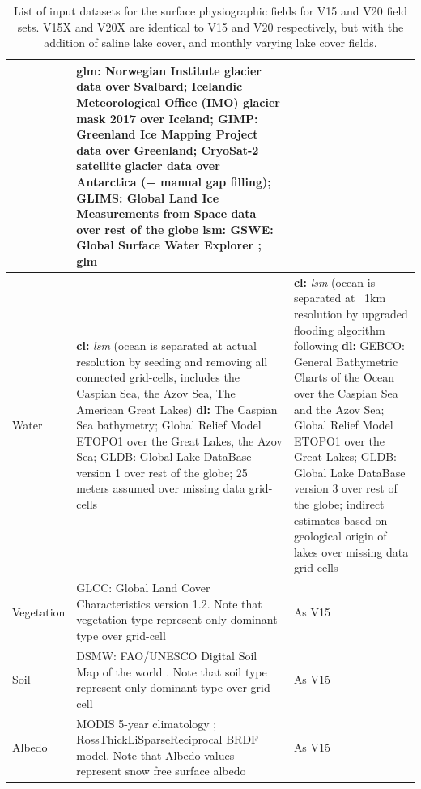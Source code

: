 \documentclass[hess, twostagejnl]{copernicus}
\providecommand{\DIFadd}[1]{{\protect\color{blue} \sf #1}} %
\providecommand{\DIFaddFL}[1]{\DIFadd{#1}} %
\begin{document}
\begin{table}
\begin{tabularx}{\textwidth}{lXX}
		 &  \DIFaddFL{\textbf{glm:} Norwegian Institute glacier data over Svalbard; Icelandic Meteorological Office (IMO) glacier mask 2017 over Iceland; GIMP: Greenland Ice Mapping Project data \citep{Howat2014} over Greenland; CryoSat-2 satellite glacier data \citep{Slater2018} over Antarctica (+ manual gap filling);  GLIMS: Global Land Ice Measurements from Space data \citep{glims} over rest of the globe  }\newline 
		 \DIFaddFL{\textbf{lsm:} GSWE: Global Surface Water Explorer \citep{GSWE}; glm }\\
		\hline
				\DIFaddFL{Water   }& 
				\DIFaddFL{\textbf{cl:} \textit{lsm} (ocean is separated at actual resolution by seeding and removing all connected grid-cells, includes the Caspian Sea, the Azov Sea, The American Great Lakes) }\newline 
				\DIFaddFL{\textbf{dl:} The Caspian Sea bathymetry; Global Relief Model ETOPO1 \citep{amante2009egrm} over the Great Lakes, the Azov Sea; GLDB: Global Lake DataBase version 1 \citep{Kourzeneva2012} over rest of the globe; 25 meters assumed over missing data grid-cells
		}& \DIFaddFL{\textbf{cl:} \textit{lsm} (ocean is separated at ~1km resolution by upgraded flooding algorithm following \cite{Choulga2019} }\newline 
		\DIFaddFL{\textbf{dl:} GEBCO: General Bathymetric Charts of the Ocean \citep{Weatherall2015} over the Caspian Sea and the Azov Sea; Global Relief Model ETOPO1 \citep{amante2009egrm} over the Great Lakes; GLDB: Global Lake DataBase version 3 \citep{Choulga2014} over rest of the globe; indirect estimates based on geological origin of lakes \citep{Choulga2014} over missing data grid-cells }\\
		\hline 
		\DIFaddFL{Vegetation }& \DIFaddFL{GLCC: Global Land Cover Characteristics version 1.2. Note that vegetation type represent only dominant type over grid-cell }& \DIFaddFL{As V15 }\\ 
		\hline
		 \DIFaddFL{Soil }& \DIFaddFL{DSMW: FAO/UNESCO Digital Soil Map of the world \citep{FAO}. Note that soil type represent only dominant type over grid-cell }& \DIFaddFL{As V15 }\\ 
		 \hline 
		 \DIFaddFL{Albedo }& \DIFaddFL{MODIS 5-year climatology \citep{SCHAAF2002135}; RossThickLiSparseReciprocal BRDF model. Note that Albedo values represent snow free surface albedo }& \DIFaddFL{As V15 }\\ 
		\bottomrule
	\end{tabularx}
	\caption{\DIFaddFL{List of input datasets for the surface physiographic fields for V15 and V20 field sets. V15X and V20X are identical to V15 and V20 respectively, but with the addition of saline lake cover, and monthly varying lake cover fields. }\newline }
	\label{tab:datasources}
\end{table}
\end{document}
